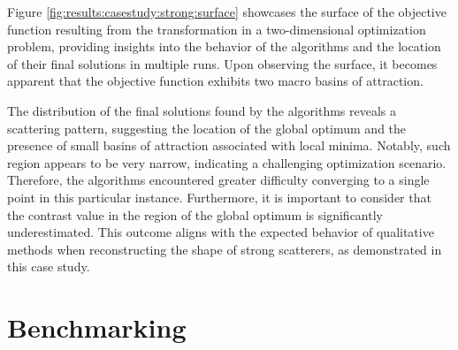 			
			Figure \ref{fig:results:casestudy:strong:surface} showcases the surface of the objective function resulting from the transformation in a two-dimensional optimization problem, providing insights into the behavior of the algorithms and the location of their final solutions in multiple runs. Upon observing the surface, it becomes apparent that the objective function exhibits two macro basins of attraction. 
			
			The distribution of the final solutions found by the algorithms reveals a scattering pattern, suggesting the location of the global optimum and the presence of small basins of attraction associated with local minima. Notably, such region appears to be very narrow, indicating a challenging optimization scenario. Therefore, the algorithms encountered greater difficulty converging to a single point in this particular instance. Furthermore, it is important to consider that the contrast value in the region of the global optimum is significantly underestimated. This outcome aligns with the expected behavior of qualitative methods when reconstructing the shape of strong scatterers, as demonstrated in this case study.
	
	\section{Benchmarking}\label{chap:results:benchmark}
		
